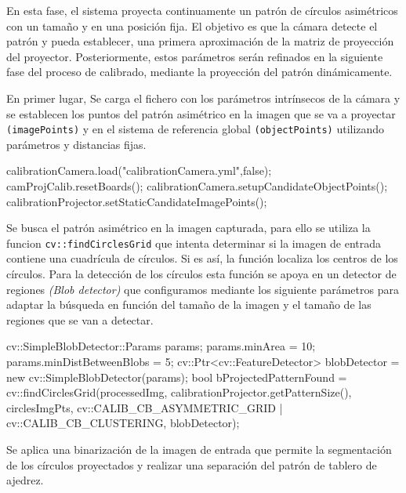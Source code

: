 En esta fase, el sistema proyecta continuamente un patrón de círculos asimétricos con un tamaño y en una posición fija. El objetivo es que la cámara detecte el patrón y pueda establecer, una primera aproximación de la matriz de proyección del proyector. Posteriormente, estos parámetros serán refinados en la siguiente fase del proceso de calibrado, mediante la proyección del patrón dinámicamente.

En primer lugar, Se carga el fichero con los parámetros intrínsecos de la cámara y se establecen los puntos del patrón asimétrico en la imagen que se va a proyectar \texttt{(imagePoints)} y en el sistema de referencia global \texttt{(objectPoints)} utilizando parámetros y distancias fijas.  

\begin{listing}[
  float=ht,
  language = C++,
  caption  = {Inicialización de la fase de calibrado del proyector},
  label    = code:ProjectorStatic]
calibrationCamera.load("calibrationCamera.yml",false);
camProjCalib.resetBoards();
calibrationCamera.setupCandidateObjectPoints();
calibrationProjector.setStaticCandidateImagePoints();
\end{listing}

Se busca el patrón asimétrico en la imagen capturada, para ello se utiliza la funcion \texttt{cv::findCirclesGrid} que intenta determinar si la imagen de entrada contiene una cuadrícula de círculos. Si es así, la función localiza los centros de los círculos. Para la detección de los círculos esta función se apoya en un detector de regiones \emph{(Blob detector)} que configuramos mediante los siguiente parámetros para adaptar la búsqueda en función del tamaño de la imagen y el tamaño de las regiones que se van a detectar.

\begin{listing}[
  float=ht,
  language = C++,
  caption  = {Parametrización del \emph{Blob Detector}},
  label    = code:BlobDetector]
cv::SimpleBlobDetector::Params params;
params.minArea = 10;
params.minDistBetweenBlobs = 5;
cv::Ptr<cv::FeatureDetector> blobDetector = new cv::SimpleBlobDetector(params);
bool bProjectedPatternFound = cv::findCirclesGrid(processedImg, calibrationProjector.getPatternSize(), circlesImgPts, cv::CALIB_CB_ASYMMETRIC_GRID | cv::CALIB_CB_CLUSTERING, blobDetector);
\end{listing}

Se aplica una binarización de la imagen de entrada que permite la segmentación de los círculos proyectados y realizar una separación del patrón de tablero de ajedrez.

